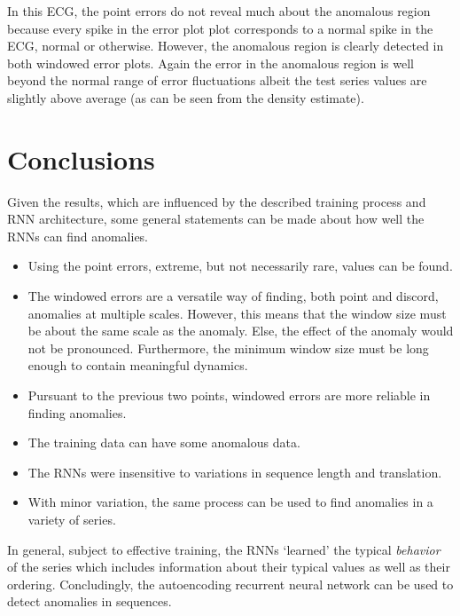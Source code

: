 In this ECG, the point errors do not reveal much about the anomalous region because every spike in the error plot plot corresponds to a normal spike in the ECG, normal or otherwise.
%
However, the anomalous region is clearly detected in both windowed error plots.
%
Again the error in the anomalous region is well beyond the normal range of error fluctuations albeit the test series values are slightly above average (as can be seen from the density estimate).

\section{Conclusions}

Given the results, which are influenced by the described training process and RNN architecture, some general statements can be made about how well the RNNs can find anomalies.

\begin{itemize}

\item 
  Using the point errors, extreme, but not necessarily rare, values can be found.

\item
  The windowed errors are a versatile way of finding, both point and discord, anomalies at multiple scales.
  However, this means that the window size must be about the same scale as the anomaly.
  Else, the effect of the anomaly would not be pronounced.
  Furthermore, the minimum window size must be long enough to contain meaningful dynamics.

\item
  Pursuant to the previous two points, windowed errors are more reliable in finding anomalies.

\item
  The training data can have some anomalous data.

\item
  The RNNs were insensitive to variations in sequence length and translation.

\item
  With minor variation, the same process can be used to find anomalies in a variety of series.

\end{itemize}

In general, subject to effective training, the RNNs `learned' the typical \emph{behavior} of the series which includes information about their typical values as well as their ordering.
%
Concludingly, the autoencoding recurrent neural network can be used to detect anomalies in sequences.



